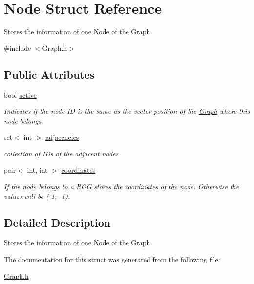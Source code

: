 \hypertarget{structNode}{}\section{Node Struct Reference}
\label{structNode}


Stores the information of one \hyperlink{structNode}{Node} of the \hyperlink{classGraph}{Graph}.  




{\ttfamily \#include $<$Graph.\+h$>$}

\subsection*{Public Attributes}
\begin{DoxyCompactItemize}
\item 
\mbox{\label{structNode_a9f86329e8fb9d0bb3541929ba067088a}} 
bool \hyperlink{structNode_a9f86329e8fb9d0bb3541929ba067088a}{active}
\begin{DoxyCompactList}\small\item\em Indicates if the node ID is the same as the vector position of the \hyperlink{classGraph}{Graph} where this node belongs. \end{DoxyCompactList}\item 
\mbox{\label{structNode_a79dc4e67eb822a12e160131482436024}} 
set$<$ int $>$ \hyperlink{structNode_a79dc4e67eb822a12e160131482436024}{adjacencies}
\begin{DoxyCompactList}\small\item\em collection of I\+Ds of the adjacent nodes \end{DoxyCompactList}\item 
\mbox{\label{structNode_a0025442a3b79014815afbede30dba0fd}} 
pair$<$ int, int $>$ \hyperlink{structNode_a0025442a3b79014815afbede30dba0fd}{coordinates}
\begin{DoxyCompactList}\small\item\em If the node belongs to a R\+GG stores the coordinates of the node. Otherwise the values will be (-\/1, -\/1). \end{DoxyCompactList}\end{DoxyCompactItemize}


\subsection{Detailed Description}
Stores the information of one \hyperlink{structNode}{Node} of the \hyperlink{classGraph}{Graph}. 

The documentation for this struct was generated from the following file\+:\begin{DoxyCompactItemize}
\item 
\hyperlink{Graph_8h}{Graph.\+h}\end{DoxyCompactItemize}
